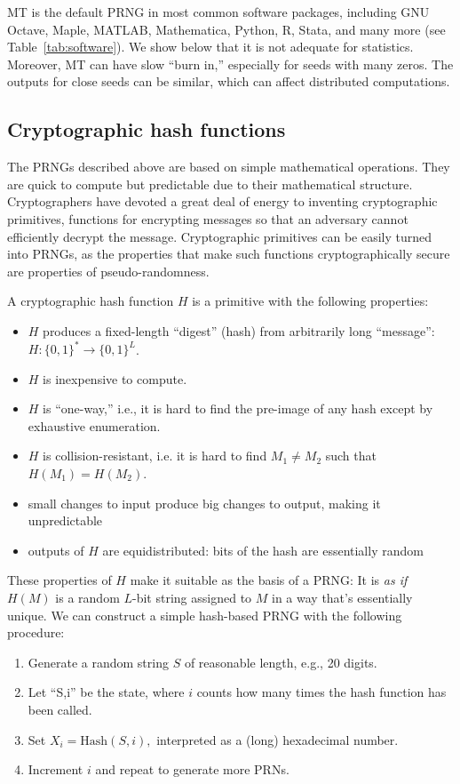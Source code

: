 \documentclass[graybox]{svmult}
\newcommand{\todo}[1]{{\color{red}{TO DO: \sc #1}}}
\begin{document}
MT is the default PRNG in most common software packages, including GNU Octave, Maple, MATLAB, Mathematica, Python, R, Stata, and many more (see Table~\ref{tab:software}).
We show below that it is not adequate for statistics.
Moreover, MT can have slow ``burn in,'' especially for seeds with many zeros. \todo{CITE}
The outputs for close seeds can be similar, which can affect distributed computations.

\subsection{Cryptographic hash functions}
The PRNGs described above are based on simple mathematical operations.
They are quick to compute but predictable due to their mathematical structure.
Cryptographers have devoted a great deal of energy to inventing cryptographic primitives,
functions for encrypting messages so that an adversary cannot efficiently decrypt the message.
Cryptographic primitives can be easily turned into PRNGs, as the properties that make such functions cryptographically secure
are properties of pseudo-randomness.

A cryptographic hash function $H$ is a primitive with the following properties:

\begin{itemize}
\item $H$ produces a fixed-length ``digest'' (hash) from arbitrarily long ``message'': $H:\{0, 1\}^* \rightarrow \{0, 1\}^L$.
\item $H$ is inexpensive to compute.
\item $H$ is ``one-way,'' i.e., it is hard to find the pre-image of any hash except by exhaustive enumeration.
\item $H$ is collision-resistant, i.e. it is hard to find $M_1 \ne M_2$ such that $H(M_1) = H(M_2)$.
\item small changes to input produce big changes to output, making it unpredictable
\item outputs of $H$ are equidistributed: bits of the hash are essentially random 
\end{itemize}

These properties of $H$ make it suitable as the basis of a PRNG:
It is \emph{as if} $H(M)$ is a random $L$-bit string assigned to $M$ in a way that's essentially unique.
We can construct a simple hash-based PRNG with the following procedure:

\begin{enumerate}
\item Generate a random string $S$ of reasonable length, e.g., 20 digits.
\item Let ``S,i'' be the state, where $i$ counts how many times the hash function has been called.
\item Set $X_i = {\mbox{Hash}}(S,i),$ interpreted as a (long) hexadecimal number.
\item Increment $i$ and repeat to generate more PRNs.
\end{enumerate}
\end{document}
